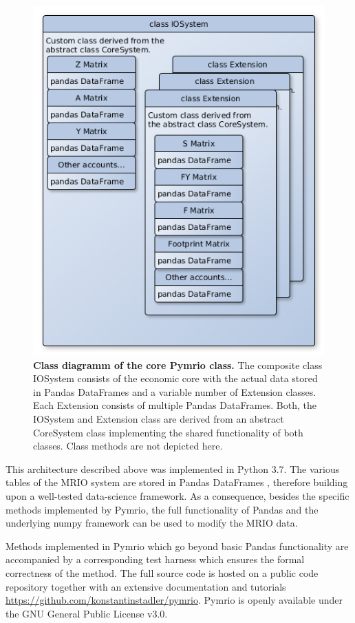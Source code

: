 \documentclass{jors}
\begin{document}
\begin{figure}[h!]
  \includegraphics[width=.9\textwidth]{./fig/IOSystem.png}
  \caption{\textbf{Class diagramm of the core Pymrio class.}
  The composite class IOSystem consists of the economic core with the actual data stored in Pandas DataFrames and a variable number of Extension classes. Each Extension consists of multiple Pandas DataFrames. Both, the IOSystem and Extension class are derived from an abstract CoreSystem class implementing the shared functionality of both classes. Class methods are not depicted here.}
  \end{figure}

This architecture described above was implemented in Python 3.7.
The various tables of the MRIO system are stored in Pandas DataFrames \cite{mckinney2010}, therefore building upon a well-tested data-science framework.
As a consequence, besides the specific methods implemented by Pymrio, the full functionality of Pandas and the underlying numpy framework \cite{vanderwalt2011} can be used to modify the MRIO data.

Methods implemented in Pymrio which go beyond basic Pandas functionality are accompanied by a corresponding test harness which ensures the formal correctness of the method.
The full source code is hosted on a public code repository together with an extensive documentation and tutorials \url{https://github.com/konstantinstadler/pymrio}.  
Pymrio is openly available under the GNU General Public License v3.0.
\end{document}
